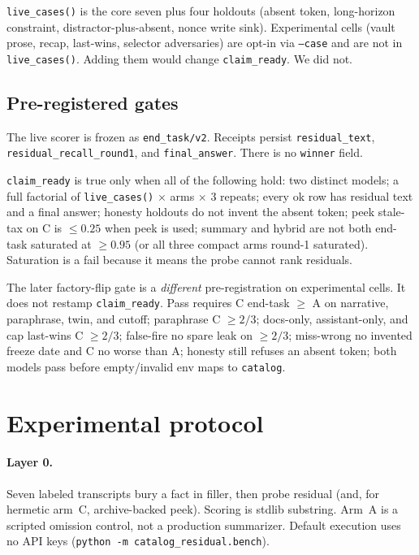 \documentclass[11pt]{article}
\newcommand{\arm}[1]{\textsf{#1}}
\newcommand{\mode}[1]{\texttt{#1}}
\begin{document}
\texttt{live\_cases()} is the core seven plus four holdouts (absent
token, long-horizon constraint, distractor-plus-absent, nonce write
sink). Experimental cells (vault prose, recap, last-wins, selector
adversaries) are opt-in via \texttt{--case} and are not in
\texttt{live\_cases()}. Adding them would change \texttt{claim\_ready}.
We did not.

\subsection{Pre-registered gates}
\label{sec:gates}

The live scorer is frozen as \texttt{end\_task/v2}. Receipts persist
\texttt{residual\_text}, \texttt{residual\_recall\_round1}, and
\texttt{final\_answer}. There is no \texttt{winner} field.

\texttt{claim\_ready} is true only when all of the following hold: two
distinct models; a full factorial of \texttt{live\_cases()} $\times$
arms $\times$ $3$ repeats; every ok row has residual text and a final
answer; honesty holdouts do not invent the absent token; peek stale-tax
on \arm{C} is ${\le}0.25$ when peek is used; summary and hybrid are not
both end-task saturated at ${\ge}0.95$ (or all three compact arms
round-1 saturated). Saturation is a fail because it means the probe
cannot rank residuals.

The later factory-flip gate is a \emph{different} pre-registration
on experimental cells. It does not restamp \texttt{claim\_ready}. Pass
requires \arm{C} end-task ${\ge}$ \arm{A} on narrative, paraphrase,
twin, and cutoff; paraphrase \arm{C} ${\ge}2/3$; docs-only,
assistant-only, and cap last-wins \arm{C} ${\ge}2/3$; false-fire no
spare leak on ${\ge}2/3$; miss-wrong no invented freeze date and
\arm{C} no worse than \arm{A}; honesty still refuses an absent token;
both models pass before empty/invalid env maps to \mode{catalog}.

\section{Experimental protocol}
\label{sec:protocol}

\paragraph{Layer 0.}
Seven labeled transcripts bury a fact in filler, then probe residual
(and, for hermetic arm~\arm{C}, archive-backed peek). Scoring is
stdlib substring. Arm~\arm{A} is a scripted omission control, not a
production summarizer. Default execution uses no API keys
(\texttt{python -m catalog\_residual.bench}).
\end{document}
